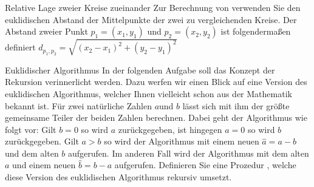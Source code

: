 \documentclass{../preamble}
\begin{document}
\begin{task}[credit = \stars{1}{3}]{Relative Lage zweier Kreise zueinander}
	Zur Berechnung von  verwenden Sie den euklidischen Abstand der Mittelpunkte der zwei zu vergleichenden Kreise. Der Abstand zweier Punkt \(p_1 = (x_1, y_1)\) und \(p_2 = (x_2, y_2)\) ist folgendermaßen definiert \(d_{p_1, p_2} = \sqrt{(x_2 - x_1)^2 + (y_2 - y_1)^2}\)

	\clearpage

	\begin{solution}
		
	\end{solution}
\end{task}

\clearpage

\begin{task}[credit = \stars{1}{3}]{Euklidischer Algorithmus}
	In der folgenden Aufgabe soll das Konzept der Rekursion verinnerlicht werden. Dazu werfen wir einen Blick auf eine Version des euklidischen Algorithmus, welcher Ihnen vielleicht schon aus der Mathematik bekannt ist. Für zwei natürliche Zahlen \(a\)und \(b\) lässt sich mit ihm der größte gemeinsame Teiler der beiden Zahlen berechnen. Dabei geht der Algorithmus wie folgt vor:
	\br
	Gilt \(b = 0\) so wird \(a\) zurückgegeben, ist hingegen \(a = 0\) so wird \(b\) zurückgegeben. Gilt \(a > b\) so wird der Algorithmus mit einem neuen \(\hat{a} = a - b\) und dem \grqq alten\grqq{} \(b\) aufgerufen. Im anderen Fall wird der Algorithmus mit dem \grqq alten\grqq{} \(a\) und einem neuen \(\hat{b} = b - a\) aufgerufen. Definieren Sie eine Prozedur , welche diese Version des euklidischen Algorithmus rekursiv umsetzt.

	\begin{solution}
		
	\end{solution}
\end{task}

\clearpage
\end{document}

